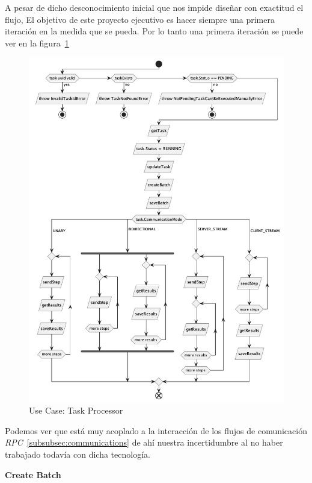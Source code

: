 A pesar de dicho desconocimiento inicial que nos impide diseñar con exactitud el flujo, El objetivo de este proyecto ejecutivo es hacer siempre una primera iteración en la medida que se pueda. Por lo tanto una primera iteración se puede ver en la figura~\cref{fig:Use Case-Task Processor}

\begin{figure}[H]
    \centering
    \includegraphics[height=0.55\textheight]{./part/Proyecto_ejecutivo/memoria_descriptiva/descripcionDelProyecto/manager/uml/1-TaskProcessor}
    \caption{Use Case: Task Processor}\label{fig:Use Case-Task Processor}
\end{figure}

Podemos ver que está muy acoplado a la interacción de los flujos de comunicación \textit{RPC}~\cref{subsubsec:communications} de ahí nuestra incertidumbre al no haber trabajado todavía con dicha tecnología.

\textbf{Create Batch}

